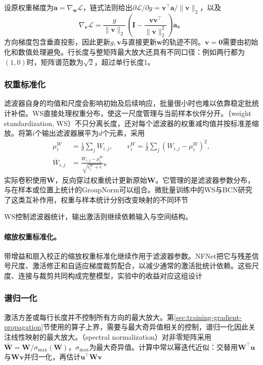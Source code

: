 设原权重梯度为$\bm a=\nabla_{\bm w}\mathcal L$，链式法则给出$\partial\mathcal L/\partial g=\bm v^{\top}\bm a/\lVert\bm v\rVert_2$，以及
\begin{equation}
  \nabla_{\bm v}\mathcal L
  =\frac{g}{\lVert\bm v\rVert_2}
    \left(\bm I-\frac{\bm v\bm v^{\top}}{\lVert\bm v\rVert_2^2}\right)\bm a\text{。}
  \label{eq:training-weightnorm-gradient}
\end{equation}
方向梯度包含垂直投影，因此更新$g,\bm v$与直接更新$\bm w$的轨迹不同。$\bm v=\bm0$需要由初始化和数值处理避免。行长度与整矩阵最大放大还具有不同口径：例如两行都为$(1,0)$时，矩阵谱范数为$\sqrt2$，超过单行长度1。

\subsubsection{权重标准化}
\label{sec:training-weight-standardization}
滤波器自身的均值和尺度会影响初始及后续响应，批量很小时也难以依靠稳定批统计补偿。WS直接处理权重分布，使这一尺度管理与当前样本伙伴分开。（weight standardization, WS）不只分离长度，还对每个滤波器的权重减均值并按标准差缩放。将第$i$个输出滤波器展平为$d$个元素，采用
\begin{equation}
  \begin{aligned}
    \mu_i^W&=\frac1d\sum_jW_{i,j},\qquad
    v_i^W=\frac1d\sum_j(W_{i,j}-\mu_i^W)^2,\\
    \bar W_{i,j}&=\frac{W_{i,j}-\mu_i^W}{\sqrt{v_i^W+\epsilon}}\text{。}
  \end{aligned}
  \label{eq:training-weight-standardization}
\end{equation}
实际卷积使用$\bar{\bm W}$，反向穿过权重统计更新原始$\bm W$。它管理的是滤波器参数分布，与在样本或位置上统计的GroupNorm可以组合。微批量训练中的WS与BCN研究了这类互补作用，权重与样本统计分别改变映射的不同环节

WS控制滤波器统计，输出激活则继续依赖输入与空间结构。

\paragraph{缩放权重标准化。}

带增益和扇入校正的缩放权重标准化继续作用于滤波器参数。NFNet把它与残差信号尺度、激活修正和自适应梯度裁剪配合，以减少通常的激活批统计依赖。这些尺度、连接与裁剪共同构成完整模型，实验中的收益对应这组设计

\subsubsection{谱归一化}
\label{sec:training-spectralnorm}
激活方差或每行长度并不控制所有方向的最大放大。第\ref{sec:training-gradient-propagation}节使用的算子上界，需要与最大奇异值相关的控制，谱归一化因此关注线性映射的最大放大。（spectral normalization）对非零矩阵采用$\bar{\bm W}=\bm W/\sigma_{\max}(\bm W)$，$\sigma_{\max}$为最大奇异值。计算中常以幂迭代近似：交替用$\bm W^{\top}\bm u$与$\bm W\bm v$并归一化，再估计$\bm u^{\top}\bm W\bm v$

